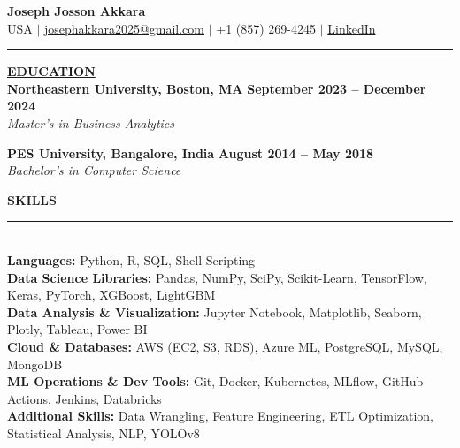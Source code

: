 \documentclass{article}
\begin{document}
\begin{center}
\thispagestyle{empty}

\large \textbf{Joseph Josson Akkara} \\
\normalsize USA $\mid$ \href{mailto:josephakkara2025@gmail.com}{josephakkara2025@gmail.com} $\mid$ +1 (857) 269-4245 $\mid$ \href{https://www.linkedin.com/in/josephjosson/}{LinkedIn} \\
\rule{\textwidth}{1pt}
\end{center}

\noindent \textbf{\underline{EDUCATION}} \\
\noindent \textbf{Northeastern University, Boston, MA} \hfill \textbf{September 2023 -- December 2024} \\
\textit{Master's in Business Analytics}

\vspace{3mm}

\noindent \textbf{PES University, Bangalore, India} \hfill \textbf{August 2014 -- May 2018} \\
\textit{Bachelor's in Computer Science}
\vspace{3mm}

\noindent \textbf{{SKILLS}} \vspace{-8pt} \\
\rule{\linewidth}{0.5pt} \\
\noindent \textbf{Languages:} Python, R, SQL, Shell Scripting \\
\textbf{Data Science Libraries:} Pandas, NumPy, SciPy, Scikit-Learn, TensorFlow, Keras, PyTorch, XGBoost, LightGBM \\
\textbf{Data Analysis \& Visualization:} Jupyter Notebook, Matplotlib, Seaborn, Plotly, Tableau, Power BI \\
\textbf{Cloud \& Databases:} AWS (EC2, S3, RDS), Azure ML, PostgreSQL, MySQL, MongoDB \\
\textbf{ML Operations \& Dev Tools:} Git, Docker, Kubernetes, MLflow, GitHub Actions, Jenkins, Databricks \\
\textbf{Additional Skills:} Data Wrangling, Feature Engineering, ETL Optimization, Statistical Analysis, NLP, YOLOv8
\vspace{3mm}
\end{document}
